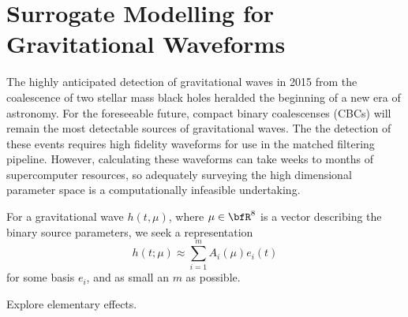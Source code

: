 

\chapter{Surrogate Modelling for Gravitational Waveforms}
The highly anticipated detection of gravitational waves in 2015 from the coalescence of two stellar mass black holes heralded the beginning of a new era of astronomy. For the foreseeable future, compact binary coalescenses (CBCs) will remain the most detectable sources of gravitational waves. The the detection of these events requires high fidelity waveforms for use in the matched filtering pipeline. However, calculating these waveforms can take weeks to months of supercomputer resources, so adequately surveying the high dimensional parameter space is a computationally infeasible undertaking.

For a gravitational wave $h(t,\mu)$, where $\mu \in \bfR^8$ is a vector describing the binary source parameters, we seek a representation
\begin{equation}
h(t;\mu) \approx \sum_{i=1}^m A_i (\mu) e_i(t)
\end{equation}
for some basis $e_i$, and as small an $m$ as possible. 

Explore elementary effects.




